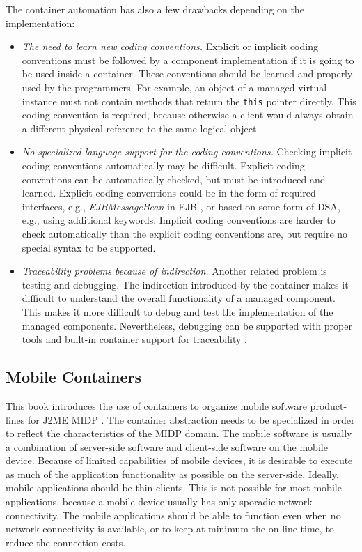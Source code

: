 \noindent The container automation has also a few drawbacks depending on the implementation:
\begin{itemize}
\item \textit{The need to learn new coding conventions.} Explicit or implicit coding conventions must be followed by a component implementation if it is going to be used inside a container. These conventions should be learned and properly used by the programmers. For example, an object of a managed virtual instance \cite{server.patterns.02} must not contain methods that return the \texttt{this} pointer directly. This coding convention is required, because otherwise a client would always obtain a different physical reference to the same logical object.

\item \textit{No specialized language support for the coding conventions.} Cheeking implicit coding conventions automatically may be difficult. Explicit coding conventions can be automatically checked, but must be introduced and learned. Explicit coding conventions could be in the form of required interfaces, e.g., \textit{EJBMessageBean} in EJB \cite{ejb21}, or based on some form of DSA, e.g., using additional keywords. Implicit coding conventions are harder to check automatically than the explicit coding conventions are, but require no special syntax to be supported.

\item \textit{Traceability problems because of indirection.} Another related problem is testing and debugging. The indirection introduced by the container makes it difficult to understand the overall functionality of a managed component. This makes it more difficult to debug and test the implementation of the managed components. Nevertheless, debugging can be supported with proper tools and built-in container support for traceability .
\end{itemize}

\subsection{Mobile Containers}
\label{c2.mobile.container}

This book introduces the use of containers to organize mobile software product-lines for J2ME MIDP \cite{www.j2me,www.midp} . The container abstraction needs to be specialized in order to reflect the characteristics of the MIDP \cite{www.midp} domain. The mobile software is usually a combination of server-side software and client-side software on the mobile device. Because of limited capabilities of mobile devices, it is desirable to execute as much of the application functionality as possible on the server-side. Ideally, mobile applications should be thin clients. This is not possible for most mobile applications, because a mobile device usually has only sporadic network connectivity. The mobile applications should be able to function even when no network connectivity is available, or to keep at minimum the on-line time, to reduce the connection costs.


